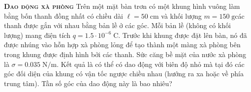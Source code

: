 
\begin{problem}
	{\textbf{\textsc{Dao động xà phòng}}} Trên một mặt bàn trơn có một khung hình vuông làm bằng bốn thanh đồng nhất có chiều dài $\ell=50\;\mathrm{cm}$ và khối lượng $m=150\;\mathrm{g}$các thanh được gắn với nhau bằng bản lề ở các góc. Mỗi bản lề (không có khối lượng) mang điện tích $q=1.5\cdot10^{-6}\;\mathrm{C}$. Trước khi khung được đặt lên bàn, nó đã được nhúng vào hỗn hợp xà phòng lỏng để tạo thành một màng xà phòng bên trong khung được định hình bởi các thanh. Sức căng bề mặt của nước xà phòng là $\sigma=0.035\;\mathrm{N/m}$. Kết quả là có thể có dao động với biên độ nhỏ mà tại đó các góc đối diện của khung có vận tốc ngược chiều nhau (hướng ra xa hoặc về phía trung tâm). Tần số góc của dao động này là bao nhiêu?
\end{problem}
